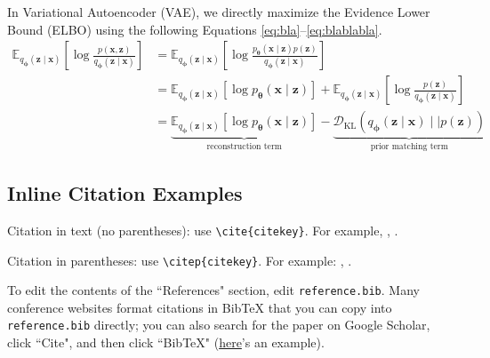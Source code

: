 \documentclass[12pt,letterpaper]{article}
\begin{document}
In Variational Autoencoder (VAE), we directly maximize the Evidence Lower Bound (ELBO) using the following Equations \ref{eq:bla}--\ref{eq:blablabla}.
\begin{align}
    \mathbb{E}_{q_{\boldsymbol{\phi}}(\boldsymbol{z}\mid\boldsymbol{x})}\left[\log\frac{p(\boldsymbol{x}, \boldsymbol{z})}{q_{\boldsymbol{\phi}}(\boldsymbol{z}\mid\boldsymbol{x})}\right]
     & = \mathbb{E}_{q_{\boldsymbol{\phi}}(\boldsymbol{z}\mid\boldsymbol{x})}\left[\log\frac{p_{\boldsymbol{\theta}}(\boldsymbol{x}\mid\boldsymbol{z})p(\boldsymbol{z})}{q_{\boldsymbol{\phi}}(\boldsymbol{z}\mid\boldsymbol{x})}\right] \label{eq:bla}                                                                                                                     \\
     & = \mathbb{E}_{q_{\boldsymbol{\phi}}(\boldsymbol{z}\mid\boldsymbol{x})}\left[\log p_{\boldsymbol{\theta}}(\boldsymbol{x}\mid\boldsymbol{z})\right] + \mathbb{E}_{q_{\boldsymbol{\phi}}(\boldsymbol{z}\mid\boldsymbol{x})}\left[\log\frac{p(\boldsymbol{z})}{q_{\boldsymbol{\phi}}(\boldsymbol{z}\mid\boldsymbol{x})}\right] \label{eq:blabla}                         \\
     & = \underbrace{\mathbb{E}_{q_{\boldsymbol{\phi}}(\boldsymbol{z}\mid\boldsymbol{x})}\left[\log p_{\boldsymbol{\theta}}(\boldsymbol{x}\mid\boldsymbol{z})\right]}_\text{reconstruction term} - \underbrace{\mathcal{D}_{\text{KL}}(q_{\boldsymbol{\phi}}(\boldsymbol{z}\mid\boldsymbol{x}) \mid\mid p(\boldsymbol{z}))}_\text{prior matching term} \label{eq:blablabla}
\end{align}

\subsection{Inline Citation Examples}

Citation in text (no parentheses): use \texttt{{\textbackslash}cite\{citekey\}}.
For example, \cite{breiman2011}, \cite{devlin2019bert}.

Citation in parentheses: use \texttt{{\textbackslash}citep\{citekey\}}.
For example: \citep{vaswani2023attention}, \citep{karras2019stylebased}.



\makereference

{\color{blue} To edit the contents of the ``References" section, edit \texttt{reference.bib}. Many conference websites format citations in BibTeX that you can copy into \texttt{reference.bib} directly; you can also search for the paper on Google Scholar, click ``Cite", and then click ``BibTeX" (\href{https://scholar.google.com/scholar?hl=en&as_sdt=0%2C23&q=attention+is+all+you+need&btnG=#d=gs_cit&t=1700436667623&u=%2Fscholar%3Fq%3Dinfo%3A5Gohgn6QFikJ%3Ascholar.google.com%2F%26output%3Dcite%26scirp%3D0%26hl%3Den}{here}'s an example).}
\end{document}
